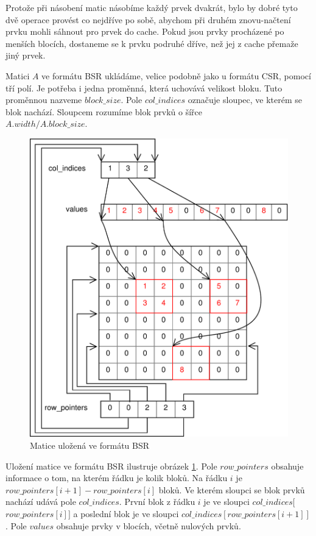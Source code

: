 Protože při násobení matic násobíme každý prvek dvakrát, bylo by dobré tyto dvě operace provést co nejdříve po sobě, abychom při druhém znovu-načtení prvku mohli sáhnout pro prvek do cache. Pokud jsou prvky procházené po menších blocích, dostaneme se k prvku podruhé dříve, než jej z cache přemaže jiný prvek.

Matici $A$ ve formátu BSR ukládáme, velice podobně jako u formátu CSR, pomocí tří polí. Je potřeba i jedna proměnná, která uchovává velikost bloku. Tuto proměnnou nazveme $block\_size$. Pole $col\_indices$ označuje sloupec, ve kterém se blok nachází. Sloupcem rozumíme blok prvků o šířce \\ $A.width / A.block\_size$.

\begin{figure}[htb]\centering
	\includegraphics[width=\textwidth]{./images/bsr/bsr}
	\caption{Matice uložená ve formátu BSR}
	\label{fig:BSR}
\end{figure}

Uložení matice ve formátu BSR ilustruje obrázek \ref{fig:BSR}. Pole $row\_pointers$ obsahuje informace o tom, na kterém řádku je kolik bloků. Na řádku $i$ je $row\_pointers[i+1] - row\_pointers[i]$ bloků. Ve kterém sloupci se blok prvků nachází udává pole $col\_indices$. První blok z řádku $i$ je ve sloupci $col\_indices[$ $row\_pointers[i]]$ a poslední blok je ve sloupci $col\_indices[ row\_pointers[i+1] ]$. Pole $values$ obsahuje prvky v blocích, včetně nulových prvků.

